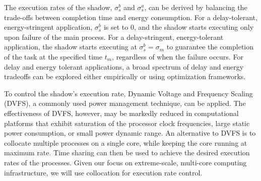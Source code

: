 
The execution rates of the shadow, $\sigma_s^b$ and $\sigma_s^a$, can be derived by balancing the trade-offs between completion time and energy consumption.
For a delay-tolerant, energy-stringent application, $\sigma_s^b$ is set to 0, and the shadow starts executing only upon failure of the main process. %
For a delay-stringent, energy-tolerant application, the shadow starts executing at $\sigma_s^b=\sigma_m$ to guarantee the completion of the task at the specified time $t_m$, regardless of when the failure occurs. 
For delay and energy tolerant applications, a broad spectrum of delay and energy tradeoffs can be explored either empirically or using optimization frameworks.






To control the shadow's execution rate, Dynamic Voltage and Frequency Scaling (DVFS), a commonly used power management technique, can be applied. 
The effectiveness of DVFS, however, may be markedly reduced in computational platforms that exhibit saturation of the processor clock frequencies, large static power consumption, or small power dynamic range. An alternative to DVFS is to collocate multiple processes on a single core, while keeping the core running at maximum rate. Time sharing can then be used to achieve the desired execution rates of the processes. Given our focus on extreme-scale, multi-core computing infrastructure, we will use collocation for execution rate control.  


